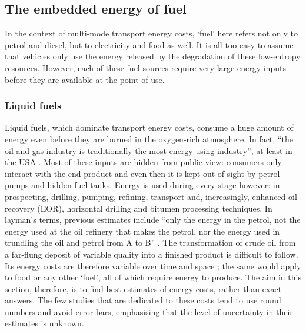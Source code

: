 \subsection{The embedded energy of fuel} 
\label{sfuelem}
In the context of multi-mode transport energy costs, `fuel' here refers not
only to petrol and diesel, but to electricity and food as well. It is all too easy
to assume that vehicles only use the energy released by the degradation of
these low-entropy resources. However, each of these fuel sources require very
large energy inputs before they are available at the point of use.

\subsubsection{Liquid fuels} 
Liquid fuels, which dominate transport energy costs, consume a huge amount of
energy even before they are burned in the oxygen-rich atmosphere. In fact,
``the oil and gas industry is traditionally the most energy-using industry'',
at least in the USA \citep{Guilford2011}. Most of these
inputs are hidden from public view: consumers only interact with the end
product and even then it is kept out of sight by petrol pumps and hidden fuel
tanks. Energy is used during every stage however: in prospecting, drilling,
pumping, refining, transport and, increasingly, enhanced oil recovery (EOR),
horizontal drilling and bitumen processing techniques. In layman's terms,
previous estimates include ``only the energy in the
petrol, not the energy used at the oil refinery that makes the petrol, nor the
energy used in trundling the oil and petrol from A to B''
\citep[p.~104]{MacKay2009}. The transformation of
crude oil from a far-flung deposit of variable quality into a finished product
is difficult to follow. Its energy costs are therefore variable over time and
space \citep{Cleveland2005}; the same would apply to food or any other `fuel',
all of which require energy to produce. The aim in this section, therefore, is
to find best estimates of energy costs, rather than exact answers. The
few studies that are dedicated to these costs tend to use round numbers and
avoid error bars, emphasising that the level of uncertainty in their estimates
is unknown.

